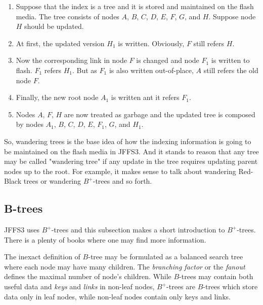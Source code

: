 \documentclass[12pt,a4paper,oneside,titlepage]{article}
\begin{document}
\begin{enumerate}

\item Suppose that the index is a tree and it is stored and maintained
on the flash media. The tree consists of nodes
$A$, $B$, $C$, $D$, $E$, $F$, $G$, and $H$.
Suppose node $H$ should be updated.

\item At first, the updated version $H_1$ is written. Obviously, $F$ still
refers $H$.

\item Now the corresponding link in node $F$ is changed and node $F_1$ is
written to flash. $F_1$ refers $H_1$. But as $F_1$ is also written
\mbox{out-of-place}, $A$ still refers the old node $F$.

\item Finally, the new root node $A_1$ is written ant it refers $F_1$.

\item Nodes $A$, $F$, $H$ are now treated as garbage and the updated tree is
composed by nodes $A_1$, $B$, $C$, $D$, $E$, $F_1$, $G$, and $H_1$.

\end{enumerate}

So, wandering trees is the base idea of how the indexing information is going
to be maintained on the flash media in JFFS3. And it stands to reason that any
tree may be called "wandering tree" if any update in the tree requires updating
parent nodes up to the root. For example, it makes sense to talk about
wandering \mbox{Red-Black} trees or wandering \mbox{$B^+$-trees} and so forth.

%
%
\subsection{B-trees} \label{ref_SectionBTrees}

JFFS3 uses \mbox{$B^+$-trees} and this subsection makes a short introduction to
\mbox{$B^+$-trees}. There is a plenty of books where one may find more
information.

The inexact definition of \mbox{$B$-tree} may be formulated as a balanced
search tree where each node may have many children. The \emph{branching factor}
or the \emph{fanout} defines the maximal number of node's children. While
\mbox{$B$-trees} may contain both useful data and \emph{keys} and \emph{links}
in \mbox{non-leaf} nodes, \mbox{$B^+$-trees} are \mbox{$B$-trees} which store
data only in leaf nodes, while \mbox{non-leaf} nodes contain only keys and
links.
\end{document}
